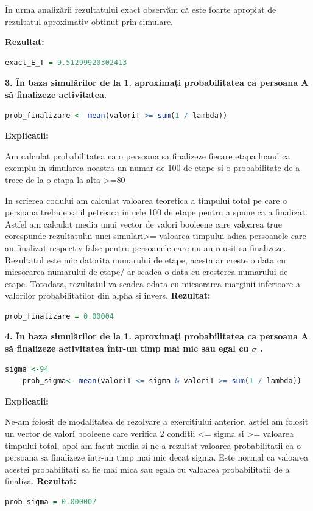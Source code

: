 \documentclass[a4paper,11pt]{article}
\begin{document}
În urma analizării rezultatului exact observăm că este foarte apropiat de rezultatul aproximativ obținut prin simulare.

\textbf{Rezultat:}
\begin{lstlisting}[language=R]
    exact_E_T = 9.51299920302413
\end{lstlisting}

\textbf{3. În baza simulărilor de la 1. aproximați probabilitatea ca persoana A să finalizeze activitatea.}
\begin{lstlisting}[language=R]
    prob_finalizare <- mean(valoriT >= sum(1 / lambda))
\end{lstlisting}
\textbf{Explicatii:} 

Am calculat probabilitatea ca o persoana sa finalizeze fiecare etapa luand ca exemplu in simularea noastra un numar de 100 de etape si o probabilitate de a trece de la o etapa la alta >=80%

In scrierea codului am calculat valoarea teoretica a timpului total pe care o persoana trebuie sa il petreaca in cele 100 de etape pentru a spune ca a finalizat. Astfel am calculat media unui vector de valori booleene care valoarea true corespunde rezultatului unei simulari>= valoarea timpului adica persoanele care au finalizat respectiv false pentru persoanele care nu au reusit sa finalizeze. Rezultatul este mic datorita numarului de etape, acesta ar creste o data cu micsorarea numarului de etape/ ar scadea o data cu cresterea numarului de etape. Totodata, rezultatul va scadea odata cu micsorarea marginii inferioare a valorilor probabilitatilor din alpha si invers.
\newline
\newline
\textbf{Rezultat:}
\begin{lstlisting}[language=R]
    prob_finalizare = 0.00004
\end{lstlisting}

\textbf{4. \^{I}n baza simul\u{a}rilor de la 1. aproxima\c{t}i probabilitatea ca persoana A s\u{a} finalizeze activitatea \^{i}ntr-un timp mai mic sau egal cu $\sigma$ . }

\begin{lstlisting}[language=R]
    sigma <-94
    prob_sigma<- mean(valoriT <= sigma & valoriT >= sum(1 / lambda))
\end{lstlisting}
\textbf{Explicatii:}

Ne-am folosit de modalitatea de rezolvare a exercitiului anterior, astfel am folosit un vector de valori booleene care verifica 2 conditii <= sigma si >= valoarea timpului total, apoi am facut media si ne-a rezultat valoarea probabilitatii ca o persoana sa finalizeze intr-un timp mai mic decat sigma. Este normal ca valoarea acestei probabilitati sa fie mai mica sau egala cu valoarea probabilitatii de a finaliza.
\newline
\newline
\textbf{Rezultat:}
\begin{lstlisting}[language=R]
    prob_sigma = 0.000007
\end{lstlisting}
\end{document}
